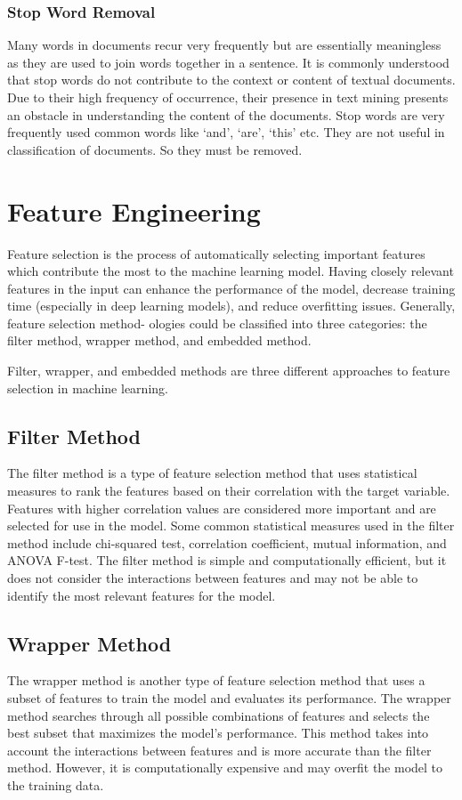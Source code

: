 \documentclass[final]{cvpr}
\begin{document}
\subsubsection{Stop Word Removal}

Many words in documents recur very
frequently but are essentially meaningless as
they are used to join words together in a
sentence. It is commonly understood that stop
words do not contribute to the context or
content of textual documents. Due to their
high frequency of occurrence, their presence
in text mining presents an obstacle in
understanding the content of the documents.
 Stop words are very frequently used
common words like ‘and’, ‘are’, ‘this’ etc.
They are not useful in classification of
documents. So they must be removed.

\section{Feature Engineering}

Feature selection is the process of automatically selecting important features which contribute the most to the machine learning model. Having closely relevant features in the input can enhance the performance of the model, decrease training time (especially in
deep learning models), and reduce overfitting issues. Generally, feature selection method-
ologies could be classified into three categories: the filter method, wrapper method, and embedded method.



Filter, wrapper, and embedded methods are three different approaches to feature selection in machine learning. 

\subsection{Filter Method}
The filter method is a type of feature selection method that uses statistical measures to rank the features based on their correlation with the target variable. Features with higher correlation values are considered more important and are selected for use in the model. Some common statistical measures used in the filter method include chi-squared test, correlation coefficient, mutual information, and ANOVA F-test. The filter method is simple and computationally efficient, but it does not consider the interactions between features and may not be able to identify the most relevant features for the model.

\subsection{Wrapper Method}
The wrapper method is another type of feature selection method that uses a subset of features to train the model and evaluates its performance. The wrapper method searches through all possible combinations of features and selects the best subset that maximizes the model's performance. This method takes into account the interactions between features and is more accurate than the filter method. However, it is computationally expensive and may overfit the model to the training data.
\end{document}
